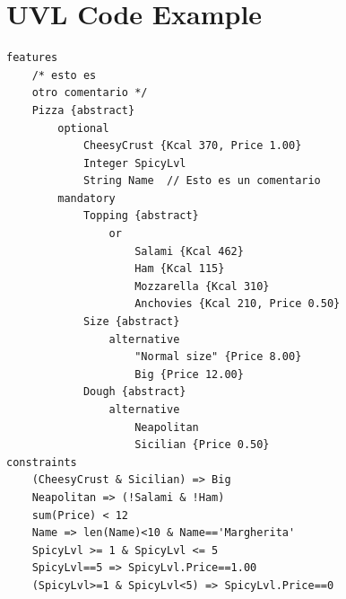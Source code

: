 \documentclass{article}
\begin{document}
\section{UVL Code Example}

\begin{lstlisting}[language=UVL, caption={A simple Pizza Model.}]
features
    /* esto es 
    otro comentario */
	Pizza {abstract}
		optional
			CheesyCrust {Kcal 370, Price 1.00}
			Integer SpicyLvl
			String Name  // Esto es un comentario
		mandatory
			Topping {abstract}
				or
					Salami {Kcal 462}
					Ham {Kcal 115}
					Mozzarella {Kcal 310}
					Anchovies {Kcal 210, Price 0.50}
			Size {abstract}
				alternative
					"Normal size" {Price 8.00}
					Big {Price 12.00}
			Dough {abstract}
				alternative
					Neapolitan 
					Sicilian {Price 0.50}
constraints
	(CheesyCrust & Sicilian) => Big
	Neapolitan => (!Salami & !Ham)
	sum(Price) < 12
	Name => len(Name)<10 & Name=='Margherita'
	SpicyLvl >= 1 & SpicyLvl <= 5
	SpicyLvl==5 => SpicyLvl.Price==1.00
	(SpicyLvl>=1 & SpicyLvl<5) => SpicyLvl.Price==0
\end{lstlisting}

\end{document}
